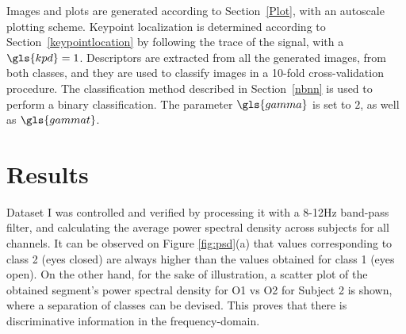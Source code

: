 Images and plots are generated according to Section~\ref{Plot}, with an autoscale plotting scheme.  Keypoint localization is determined according to Section~\ref{keypointlocation} by following the trace of the signal, with a $\gls{kpd} = 1$.   Descriptors are extracted from all the generated images, from both classes, and they are used to classify images in a 10-fold cross-validation procedure.  The classification method described in Section~\ref{nbnn} is used to perform a binary classification.  The parameter $\gls{gamma}$ is set to $2$, as well as $\gls{gammat}$.  


%

\section{Results}

Dataset I was controlled and verified by processing it with a 8-12Hz band-pass filter, and calculating the average power spectral density across subjects for all channels.  It can be observed on Figure \ref{fig:psd}(a)  that values corresponding to class 2 (eyes closed) are always higher than the values obtained for class 1 (eyes open). On the other hand, for the sake of illustration, a scatter plot of the obtained segment's power spectral density for O1 vs O2 for Subject 2 is shown, where a separation of classes can be devised.  This proves that there is discriminative information in the frequency-domain.



